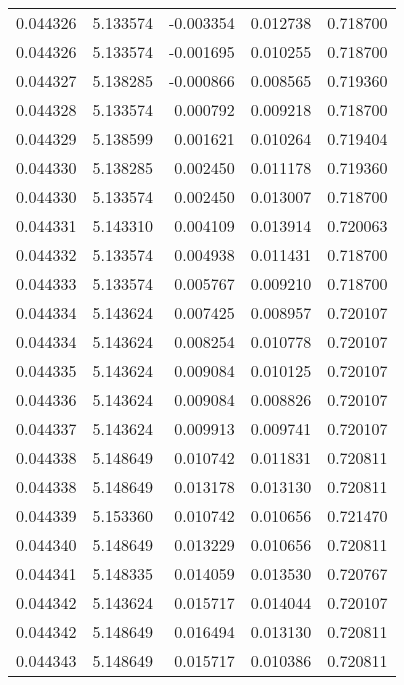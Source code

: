 \begin{tabular}{lrrrr}
0.044326    &  5.133574 & -0.003354 &  0.012738 &             0.718700 \\
0.044326    &  5.133574 & -0.001695 &  0.010255 &             0.718700 \\
0.044327    &  5.138285 & -0.000866 &  0.008565 &             0.719360 \\
0.044328    &  5.133574 &  0.000792 &  0.009218 &             0.718700 \\
0.044329    &  5.138599 &  0.001621 &  0.010264 &             0.719404 \\
0.044330    &  5.138285 &  0.002450 &  0.011178 &             0.719360 \\
0.044330    &  5.133574 &  0.002450 &  0.013007 &             0.718700 \\
0.044331    &  5.143310 &  0.004109 &  0.013914 &             0.720063 \\
0.044332    &  5.133574 &  0.004938 &  0.011431 &             0.718700 \\
0.044333    &  5.133574 &  0.005767 &  0.009210 &             0.718700 \\
0.044334    &  5.143624 &  0.007425 &  0.008957 &             0.720107 \\
0.044334    &  5.143624 &  0.008254 &  0.010778 &             0.720107 \\
0.044335    &  5.143624 &  0.009084 &  0.010125 &             0.720107 \\
0.044336    &  5.143624 &  0.009084 &  0.008826 &             0.720107 \\
0.044337    &  5.143624 &  0.009913 &  0.009741 &             0.720107 \\
0.044338    &  5.148649 &  0.010742 &  0.011831 &             0.720811 \\
0.044338    &  5.148649 &  0.013178 &  0.013130 &             0.720811 \\
0.044339    &  5.153360 &  0.010742 &  0.010656 &             0.721470 \\
0.044340    &  5.148649 &  0.013229 &  0.010656 &             0.720811 \\
0.044341    &  5.148335 &  0.014059 &  0.013530 &             0.720767 \\
0.044342    &  5.143624 &  0.015717 &  0.014044 &             0.720107 \\
0.044342    &  5.148649 &  0.016494 &  0.013130 &             0.720811 \\
0.044343    &  5.148649 &  0.015717 &  0.010386 &             0.720811 \\

\end{tabular}
